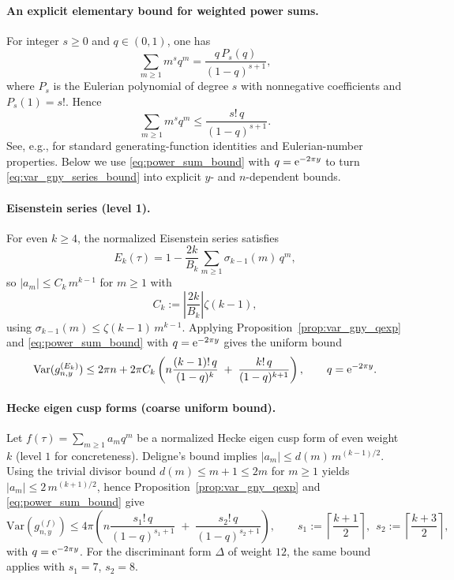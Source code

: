 \paragraph{An explicit elementary bound for weighted power sums.}
For integer $s\ge 0$ and $q\in(0,1)$, one has
\begin{equation}
\sum_{m\ge 1} m^s q^m = \frac{q\,P_s(q)}{(1-q)^{s+1}},
\end{equation}
where $P_s$ is the Eulerian polynomial of degree $s$ with nonnegative coefficients and $P_s(1)=s!$. Hence
\begin{equation}
\sum_{m\ge 1} m^s q^m \le \frac{s!\,q}{(1-q)^{s+1}}.
\label{eq:power_sum_bound}
\end{equation}
See, e.g., \cite{GrahamKnuthPatashnik1994} for standard generating-function identities and Eulerian-number properties.
Below we use \eqref{eq:power_sum_bound} with $q=\mathrm{e}^{-2\pi y}$ to turn \eqref{eq:var_gny_series_bound} into explicit $y$- and $n$-dependent bounds.

\paragraph{Eisenstein series (level 1).}
For even $k\ge 4$, the normalized Eisenstein series satisfies
\begin{equation}
E_k(\tau)=1-\frac{2k}{B_k}\sum_{m\ge 1}\sigma_{k-1}(m)\,q^m,
\end{equation}
so $|a_m|\le C_k\,m^{k-1}$ for $m\ge 1$ with
\begin{equation}
C_k:=\left|\frac{2k}{B_k}\right|\zeta(k-1),
\end{equation}
using $\sigma_{k-1}(m)\le \zeta(k-1)\,m^{k-1}$. Applying Proposition~\ref{prop:var_gny_qexp} and \eqref{eq:power_sum_bound} with $q=\mathrm{e}^{-2\pi y}$ gives the uniform bound
\begin{equation}
\mathrm{Var}(g_{n,y}^{(E_k)})
\le
2\pi n
+
2\pi C_k\left(
n\frac{(k-1)!\,q}{(1-q)^{k}}
\;+\;
\frac{k!\,q}{(1-q)^{k+1}}
\right),
\qquad q=\mathrm{e}^{-2\pi y}.
\label{eq:var_bound_eisenstein}
\end{equation}

\paragraph{Hecke eigen cusp forms (coarse uniform bound).}
Let $f(\tau)=\sum_{m\ge 1} a_m q^m$ be a normalized Hecke eigen cusp form of even weight $k$ (level $1$ for concreteness). Deligne's bound implies $|a_m|\le d(m)\,m^{(k-1)/2}$. Using the trivial divisor bound $d(m)\le m+1\le 2m$ for $m\ge 1$ yields $|a_m|\le 2\,m^{(k+1)/2}$, hence Proposition~\ref{prop:var_gny_qexp} and \eqref{eq:power_sum_bound} give
\begin{equation}
\mathrm{Var}(g_{n,y}^{(f)})
\le
4\pi\left(
n\frac{s_1!\,q}{(1-q)^{s_1+1}}
\;+\;
\frac{s_2!\,q}{(1-q)^{s_2+1}}
\right),
\qquad
s_1:=\left\lceil\frac{k+1}{2}\right\rceil,\ \ s_2:=\left\lceil\frac{k+3}{2}\right\rceil,
\label{eq:var_bound_cusp_coarse}
\end{equation}
with $q=\mathrm{e}^{-2\pi y}$. For the discriminant form $\Delta$ of weight $12$, the same bound applies with $s_1=7$, $s_2=8$.

